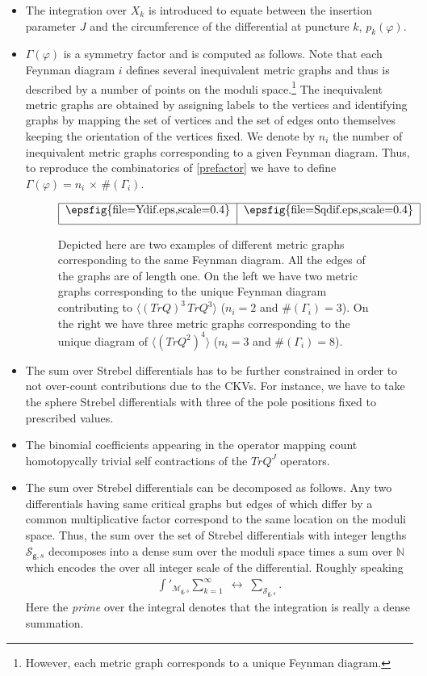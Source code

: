 \documentclass[11pt]{JHEP3}
\def\be{\begin{eqnarray}}
\def\ee{\end{eqnarray}}
\def\vf{\varphi}
\def\gg{\mathsf g }
\begin{document}
\begin{itemize}
\item The integration over $X_k$ is introduced to equate between the insertion parameter $J$
and the circumference of the differential at puncture $k$, $p_k(\vf)$.
\item $\Gamma(\vf)$ is a symmetry factor and is computed as follows.
Note that each Feynman diagram $i$ defines several inequivalent metric graphs and thus
is described by a number of points on the moduli space.\footnote{However, each metric graph
corresponds to a unique Feynman diagram.} The inequivalent metric graphs
are obtained by assigning labels to the vertices and identifying graphs by mapping the set 
of vertices and the set of edges onto themselves keeping the orientation of the vertices fixed.
 We denote by $n_i$ the number of inequivalent metric graphs corresponding to a given Feynman diagram. Thus, to reproduce the combinatorics of \eqref{prefactor} we have
to define $\Gamma(\vf)=n_i\,\times\,\#(\Gamma_i)$.
\begin{figure}[htbp]
 \begin{center}
$\begin{tabular}{|c|c|}
\hline
\epsfig{file=Ydif.eps,scale=0.4}  & \epsfig{file=Sqdif.eps,scale=0.4}
\\ [0.2cm]\hline \end{tabular}$
\caption{Depicted here are two examples of different metric graphs corresponding
to the same Feynman diagram. All the edges of the graphs are of length one. On the left we have two metric graphs 
corresponding to the unique Feynman diagram contributing to $\langle (TrQ)^3\,TrQ^3\rangle$
($n_i=2$ and $\#(\Gamma_i)=3$). On the right we have three metric graphs corresponding to the unique diagram of $\langle (TrQ^2)^4\rangle$ ($n_i=3$ and $\#(\Gamma_i)=8$).} \label{metricFeyn}
\end{center}
\end{figure}
\item The sum over Strebel differentials has to be further constrained in order
to not over-count contributions due to the CKVs. For instance, we have to take the sphere
Strebel differentials with three of the pole positions fixed to prescribed values.
\item 
The binomial coefficients appearing in the operator mapping count 
homotopycally trivial self contractions of the $TrQ^J$ operators.
\item The sum over Strebel differentials can be decomposed as follows. Any two differentials
having same critical graphs but edges of which differ by a common multiplicative factor
correspond to the same location on the moduli space. Thus, the sum over the set of Strebel differentials with integer lengths ${\mathcal S}_{\gg,s}$ decomposes
into a dense sum over the moduli space times a sum over ${\mathbb N}$ which encodes the over all integer scale of the differential. Roughly speaking
\be\label{mgk_meas}
\int'_{{\mathcal M}_{\gg,s}}\sum_{k=1}^\infty\;\longleftrightarrow\;\sum_{\mathcal S_{\gg,s}}.
\ee Here the \textit{prime} over the integral denotes that the integration is really a dense summation.
\end{itemize}
\end{document}
